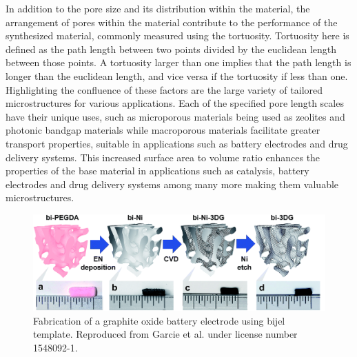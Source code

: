 In addition to the pore size and its distribution within the material, the arrangement of pores within the material contribute to the 
performance of the synthesized material, commonly measured using the tortuosity. Tortuosity here is defined as the path length between 
two points divided by the euclidean length between those points. A tortuosity larger than one implies that the path length is longer 
than the euclidean length, and vice versa if the tortuosity if less than one. Highlighting the confluence of these factors are the 
large variety of tailored microstructures for various applications. Each of the specified pore length scales have their unique uses, 
such as microporous materials being used as zeolites and photonic bandgap materials while macroporous materials facilitate greater 
transport properties, suitable in applications such as battery electrodes and drug delivery systems. \cite{chen_tortuosity_2020, 
ebner_tortuosity_2014} This increased surface area to volume ratio enhances the properties of the base material in applications such 
as catalysis, battery electrodes and drug delivery systems among many more making them valuable microstructures. 
\cite{cha_bicontinuous_2019, samdani_bicontinuous_2017, thorson_bijel-templated_2019, zhao_highly_2014}

\begin{figure}
    \centering
    \includegraphics[scale = 0.5]{figures/introduction/bijel_templating.png}
    \caption{Fabrication of a graphite oxide battery electrode using bijel template. Reproduced from Garcie et al. under license number 1548092-1. \cite{garcia_scalable_2019}}
    \label{fig:bijel_template}
\end{figure}

